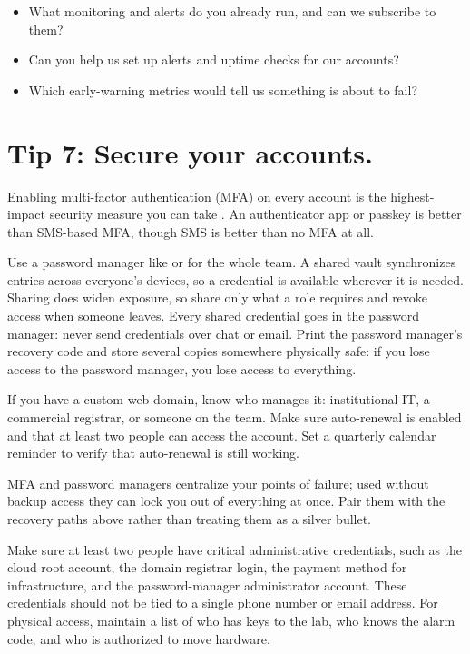 \documentclass[10pt,letterpaper]{article}
\begin{document}
\begin{notebox}
  \begin{itemize}
  \item What monitoring and alerts do you already run, and can we subscribe to them?
  \item Can you help us set up alerts and uptime checks for our accounts?
  \item Which early-warning metrics would tell us something is about to fail?
  \end{itemize}
\end{notebox}

\section*{Tip 7: Secure your accounts.}

Enabling multi-factor authentication (MFA) on every account is the
highest-impact security measure you can take \cite{smalls2021}. An authenticator
app or passkey is better than SMS-based MFA, though SMS is better than no MFA at
all.

Use a password manager like  or
 for the whole team. A shared vault
synchronizes entries across everyone's devices, so a credential is available
wherever it is needed. Sharing does widen exposure, so share only what a role
requires and revoke access when someone leaves. Every shared credential goes in
the password manager: never send credentials over chat or email. Print the
password manager's recovery code and store several copies somewhere physically
safe: if you lose access to the password manager, you lose access to everything.

If you have a custom web domain, know who manages it: institutional IT, a
commercial registrar, or someone on the team. Make sure auto-renewal is enabled
and that at least two people can access the account. Set a quarterly calendar
reminder to verify that auto-renewal is still working.

MFA and password managers centralize your points of failure; used without backup
access they can lock you out of everything at once. Pair them with the recovery
paths above rather than treating them as a silver bullet.

Make sure at least two people have critical administrative credentials, such as
the cloud root account, the domain registrar login, the payment method for
infrastructure, and the password-manager administrator account.  These
credentials should not be tied to a single phone number or email address.  For
physical access, maintain a list of who has keys to the lab, who knows the alarm
code, and who is authorized to move hardware.
\end{document}
